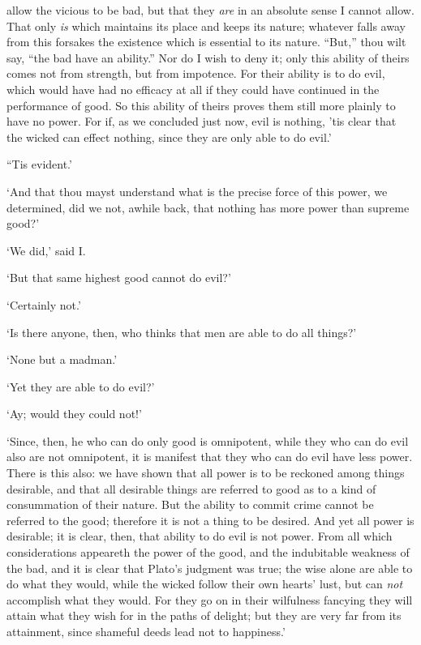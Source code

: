 \documentclass[11pt]{book}
\begin{document}
allow the vicious to be bad, but that they \emph{are} in an absolute sense I
cannot allow. That only \emph{is} which maintains its place and keeps its
nature; whatever falls away from this forsakes the existence which is
essential to its nature. ``But,'' thou wilt say, ``the bad have an
ability.'' Nor do I wish to deny it; only this ability of theirs comes
not from strength, but from impotence. For their ability is to do evil,
which would have had no efficacy at all if they could have continued in
the performance of good. So this ability of theirs proves them still
more plainly to have no power. For if, as we concluded just now, evil is
nothing, 'tis clear that the wicked can effect nothing, since they are
only able to do evil.'

``Tis evident.'

`And that thou mayst understand what is the precise force of this power,
we determined, did we not, awhile back, that nothing has more power than
supreme good?'

`We did,' said I.

`But that same highest good cannot do evil?'

`Certainly not.'

`Is there anyone, then, who thinks that men are able to do all things?'

`None but a madman.'

`Yet they are able to do evil?'

`Ay; would they could not!'

`Since, then, he who can do only good is omnipotent, while they who can
do evil also are not omnipotent, it is manifest that they who can do
evil have less power. There is this also: we have shown that all power
is to be reckoned among things desirable, and that all desirable things
are referred to good as to a kind of consummation of their nature. But
the ability to commit crime cannot be referred to the good; therefore it
is not a thing to be desired. And yet all power is desirable; it is
clear, then, that ability to do evil is not power. From all which
considerations appeareth the power of the good, and the indubitable
weakness of the bad, and it is clear that Plato's judgment was true; the
wise alone are able to do what they would, while the wicked follow their
own hearts' lust, but can \emph{not} accomplish what they would. For they go
on in their wilfulness fancying they will attain what they wish for in
the paths of delight; but they are very far from its attainment, since
shameful deeds lead not to happiness.'
\end{document}
